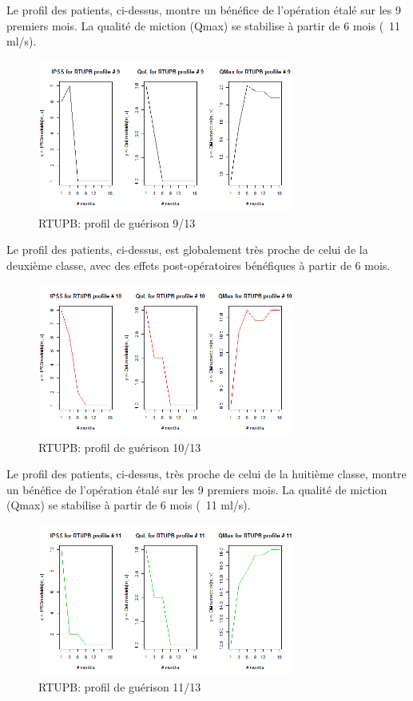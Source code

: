 Le profil des patients, ci-dessus, montre un bénéfice de l'opération étalé sur les 9 premiers mois. La qualité de miction (Qmax) se stabilise à partir de 6 mois (~11 ml/s).

\begin{figure}[H]
\centering
\includegraphics[width=0.75\textwidth]{../Fig/RTUPB/rtupb-profil-post-09.png}
\caption{RTUPB: profil de guérison 9/13}

\end{figure}

Le profil des patients, ci-dessus, est globalement très proche de celui de la deuxième classe, avec des effets post-opératoires bénéfiques à partir de 6 mois.

\begin{figure}[H]
\centering
\includegraphics[width=0.75\textwidth]{../Fig/RTUPB/rtupb-profil-post-10.png}
\caption{RTUPB: profil de guérison 10/13}
\end{figure}

Le profil des patients, ci-dessus, très proche de celui de la huitième classe, montre un bénéfice de l'opération étalé sur les 9 premiers mois. La qualité de miction (Qmax) se stabilise à partir de 6 mois (~11 ml/s).

\begin{figure}[H]
\centering
\includegraphics[width=0.75\textwidth]{../Fig/RTUPB/rtupb-profil-post-11.png}
\caption{RTUPB: profil de guérison 11/13}
\end{figure}


